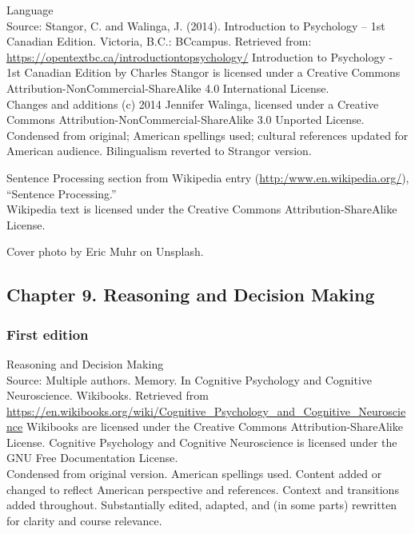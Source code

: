 \documentclass[
]{krantz}
\begin{document}
Language\\
Source: Stangor, C. and Walinga, J. (2014). Introduction to Psychology -- 1st Canadian Edition. Victoria, B.C.: BCcampus. Retrieved from: \url{https://opentextbc.ca/introductiontopsychology/}
Introduction to Psychology - 1st Canadian Edition by Charles Stangor is licensed under a Creative Commons Attribution-NonCommercial-ShareAlike 4.0 International License.\\
Changes and additions (c) 2014 Jennifer Walinga, licensed under a Creative Commons Attribution-NonCommercial-ShareAlike 3.0 Unported License.\\
Condensed from original; American spellings used; cultural references updated for American audience. Bilingualism reverted to Strangor version.

Sentence Processing section from Wikipedia entry (\url{http:/www.en.wikipedia.org/}), ``Sentence Processing.''\\
Wikipedia text is licensed under the Creative Commons Attribution-ShareAlike License.

Cover photo by Eric Muhr on Unsplash.

\hypertarget{chapter-9.-reasoning-and-decision-making}{%
\subsection*{Chapter 9. Reasoning and Decision Making}\label{chapter-9.-reasoning-and-decision-making}}


\hypertarget{first-edition-9}{%
\subsubsection*{First edition}\label{first-edition-9}}


Reasoning and Decision Making\\
Source: Multiple authors. Memory. In Cognitive Psychology and Cognitive Neuroscience. Wikibooks. Retrieved from \url{https://en.wikibooks.org/wiki/Cognitive_Psychology_and_Cognitive_Neuroscience}
Wikibooks are licensed under the Creative Commons Attribution-ShareAlike License.
Cognitive Psychology and Cognitive Neuroscience is licensed under the GNU Free Documentation License.\\
Condensed from original version. American spellings used. Content added or changed to reflect American perspective and references. Context and transitions added throughout. Substantially edited, adapted, and (in some parts) rewritten for clarity and course relevance.
\end{document}
